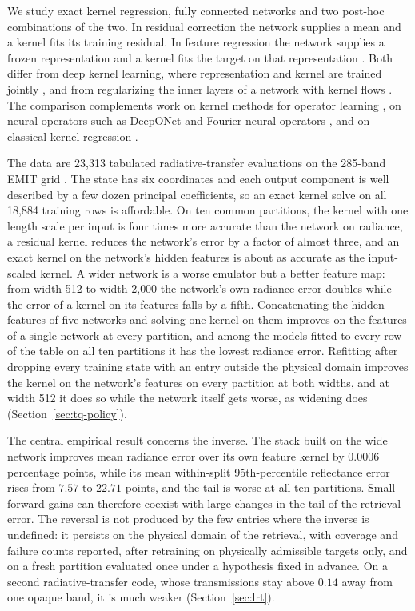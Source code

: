 \documentclass[11pt]{article}
\newcommand{\1}{\mathbf{1}}
\begin{document}
We study exact kernel regression, fully connected networks and two post-hoc combinations of
the two. In residual correction the network supplies a mean and a kernel fits its training
residual. In feature regression the network supplies a frozen representation and a kernel
fits the target on that representation \cite{nmkc}. Both differ from deep kernel learning,
where representation and kernel are trained jointly \cite{wilson}, and from regularizing the
inner layers of a network with kernel flows \cite{yoo}. The comparison complements work on
kernel methods for operator learning \cite{batlle}, on neural operators such as DeepONet and
Fourier neural operators \cite{deeponet,fno}, and on classical kernel regression \cite{rw}.

The data are 23{,}313 tabulated radiative-transfer evaluations on the 285-band EMIT grid
\cite{green}. The state has six coordinates and each output component is well described by
a few dozen principal coefficients, so an exact kernel solve on all 18{,}884 training rows is
affordable. On ten common partitions, the kernel with one length scale per input is four times
more accurate than the network on radiance, a residual kernel reduces the network's error by
a factor of almost three, and an exact kernel on the network's hidden features is about as
accurate as the input-scaled kernel. A wider network is a worse emulator but a better feature
map: from width 512 to width 2{,}000 the network's own radiance error doubles while the error
of a kernel on its features falls by a fifth. Concatenating the hidden features of five
networks and solving one kernel on them improves on the features of a single network at every
partition, and among the models fitted to every row of the table on all ten partitions it has the
lowest radiance error. Refitting after dropping every training state with an entry outside the physical domain improves the kernel on the network's features on every partition at both widths, and at width 512 it does so while the network itself gets worse, as widening does (Section~\ref{sec:tq-policy}).

The central empirical result concerns the inverse. The stack built on the wide network
improves mean radiance error over its own feature kernel by $0.0006$ percentage points, while
its mean within-split 95th-percentile reflectance error rises from $7.57$ to $22.71$ points,
and the tail is worse at all ten partitions. Small forward gains can therefore coexist with
large changes in the tail of the retrieval error. The reversal is not produced by the few
entries where the inverse is undefined: it persists on the physical domain of the retrieval,
with coverage and failure counts reported, after retraining on physically admissible targets only, and on a fresh partition evaluated
once under a hypothesis fixed in advance. On a second radiative-transfer code, whose transmissions stay above $0.14$ away from one opaque band, it is much weaker (Section~\ref{sec:lrt}).
\end{document}
